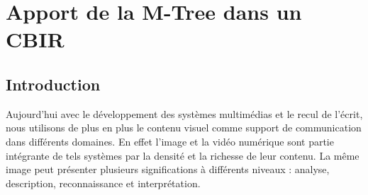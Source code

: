 
\chapter{Apport de la M-Tree dans un CBIR} %

\label{ChapterX} %


\section{Introduction}
Aujourd’hui avec le développement des systèmes multimédias et le recul de l’écrit, nous utilisons de plus en plus le contenu visuel comme support de communication dans différents domaines. En effet l’image et la vidéo numérique sont partie intégrante de tels systèmes par la
densité et la richesse de leur contenu. La même image peut présenter plusieurs significations à différents niveaux : analyse, description, reconnaissance et interprétation.